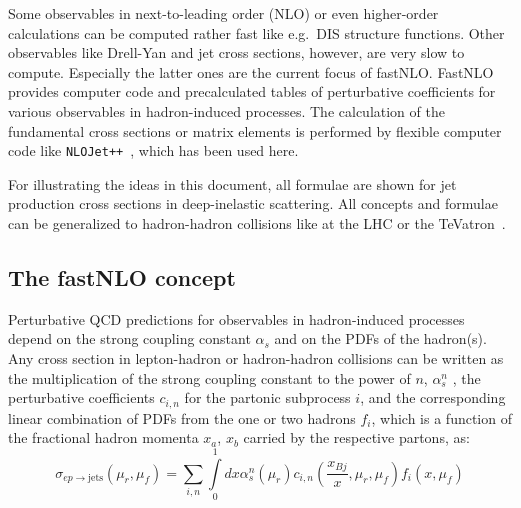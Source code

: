\documentclass{DISproc}
\begin{document}
Some observables in next-to-leading order (NLO) or even higher-order
calculations can be computed rather fast like e.g.\ DIS structure
functions.  Other observables like Drell-Yan and jet cross sections,
however, are very slow to compute. Especially the latter ones are the
current focus of fastNLO. FastNLO provides computer code and
precalculated tables of perturbative coefficients for various
observables in hadron-induced processes.
The calculation of the fundamental cross sections or matrix elements is
performed by flexible computer code like
\texttt{NLOJet++}~\cite{Nagy:1998bb,Nagy:2001xb,Nagy:2001fj,Nagy:2003tz},
which has been used here.

For illustrating the ideas in this document, all formulae are shown for
jet production cross sections in deep-inelastic scattering.
All concepts and formulae can be generalized to
hadron-hadron collisions like at the LHC or the TeVatron~\cite{Kluge:2006xs}.


\subsection{The fastNLO concept}

Perturbative QCD predictions for observables in hadron-induced
processes depend on the strong coupling constant $\alpha_s$ and on the
PDFs of the hadron(s). Any cross section in lepton-hadron or
hadron-hadron collisions can be written as the multiplication of the
strong coupling constant to the power of $n$, $\alpha_s^n$ , the
perturbative coefficients $c_{i,n}$ for the partonic subprocess $i$,
and the corresponding linear combination of PDFs from the one or two
hadrons $f_i$, which is a function of the fractional hadron momenta
$x_a$, $x_b$ carried by the respective partons, as:
\begin{equation}\label{eq:CrossSection}
  \sigma_{ep\rightarrow\mathrm{jets}}(\mu_r,\mu_f) =
  \sum\limits_{i,n}\int\limits_0^1dx\alpha_s^n(\mu_r)c_{i,n}(\frac{x_{Bj}}{x},\mu_r,\mu_f)f_i(x,\mu_f)
\end{equation}
\end{document}

